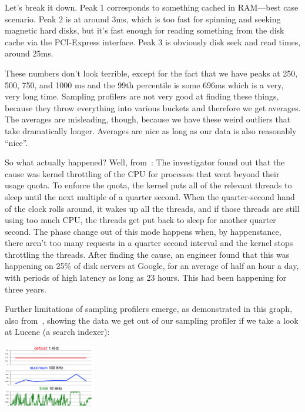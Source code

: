 \documentclass[a4paper]{report}
\begin{document}
Let's break it down. Peak 1 corresponds to something cached in RAM---best case scenario. Peak 2 is at around 3ms, which is too fast for spinning and seeking magnetic hard disks, but it's fast enough for reading something from the disk cache via the PCI-Express interface. Peak 3 is obviously disk seek and read times, around 25ms. 

These numbers don't look terrible, except for the fact that we have peaks at 250, 500, 750, and 1000 ms and the 99th percentile is some 696ms which is a very, very long time. Sampling profilers are not very good at finding these things, because they throw everything into various buckets and therefore we get averages. The averages are misleading, though, because we have these weird outliers that take dramatically longer. Averages are nice as long as our data is also reasonably ``nice''.

So what actually happened? Well, from~\cite{perf-tracing}: The investigator found out that the cause was kernel throttling of the CPU for processes that went beyond their usage quota. To enforce the quota, the kernel puts all of the relevant threads to sleep until the next multiple of a quarter second. When the quarter-second hand of the clock rolls around, it wakes up all the threads, and if those threads are still using too much CPU, the threads get put back to sleep for another quarter second. The phase change out of this mode happens when, by happenstance, there aren't too many requests in a quarter second interval and the kernel stops throttling the threads. After finding the cause, an engineer found that this was happening on 25\% of disk servers at Google, for an average of half an hour a day, with periods of high latency as long as 23 hours. This had been happening for three years.

Further limitations of sampling profilers emerge, as demonstrated in this graph, also from~\cite{perf-tracing}, showing the data we get out of our sampling profiler if we take a look at Lucene (a search indexer):

\begin{center}
	\includegraphics[width=0.3\textwidth]{images/perf-sample.png}
\end{center}
\end{document}
